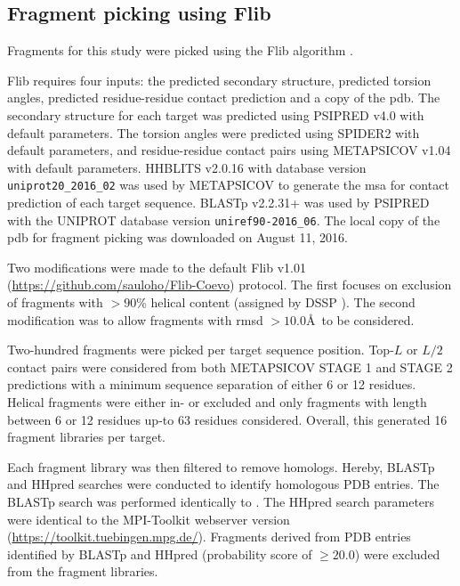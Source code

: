 \subsection{Fragment picking using Flib}
Fragments for this study were picked using the Flib algorithm \cite{De_Oliveira2015-ba}. 

Flib requires four inputs: the predicted secondary structure, predicted torsion angles, predicted residue-residue contact prediction and a copy of the \gls{pdb}. The secondary structure for each target was predicted using PSIPRED v4.0 \cite{Jones1999-fi} with default parameters. The torsion angles were predicted using SPIDER2 \cite{Heffernan2015-wp} with default parameters, and residue-residue contact pairs using METAPSICOV v1.04 \cite{Jones2015-wp} with default parameters. HHBLITS v2.0.16 \cite{Remmert2011-ze} with database version \texttt{uniprot20\_2016\_02} was used by METAPSICOV to generate the \gls{msa} for contact prediction of each target sequence. BLASTp v2.2.31+ \cite{Altschul1990-nc,Camacho2009-ue} was used by PSIPRED with the UNIPROT database version \texttt{uniref90-2016\_06}. The local copy of the \gls{pdb} for fragment picking was downloaded on August 11, 2016.

Two modifications were made to the default Flib v1.01 (\url{https://github.com/sauloho/Flib-Coevo}) protocol. The first focuses on exclusion of fragments with $>90$\% helical content (assigned by DSSP \cite{Frishman1995-ns}). The second modification was to allow fragments with \gls{rmsd} $>10.0$\AA\ to be considered.

Two-hundred fragments were picked per target sequence position. Top-$L$ or $L/2$ contact pairs were considered from both METAPSICOV STAGE 1 and STAGE 2 predictions with a minimum sequence separation of either 6 or 12 residues. Helical fragments were either in- or excluded and only fragments with length between 6 or 12 residues up-to 63 residues considered. Overall, this generated 16 fragment libraries per target.

Each fragment library was then filtered to remove homologs. Hereby, BLASTp and HHpred \cite{Soding2005-sx} searches were conducted to identify homologous PDB entries. The BLASTp search was performed identically to \cite{De_Oliveira2015-ba}. The HHpred search parameters were identical to the MPI-Toolkit \cite{Biegert2006-ny} webserver version (\url{https://toolkit.tuebingen.mpg.de/}). Fragments derived from PDB entries identified by BLASTp and HHpred (probability score of $\geq20.0$) were excluded from the fragment libraries.

